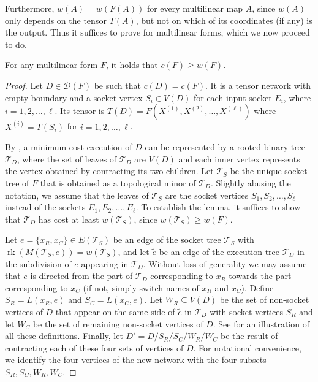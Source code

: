 \documentclass{toc}
\newcommand{\rk}{\ensuremath{\operatorname{rk}}}
\newcommand{\ts}{\ensuremath{\mathcal{T}_S}}
\newcommand{\td}{\ensuremath{\mathcal{T}_D}}
\begin{document}
Furthermore, $w(A) = w(F(A))$ for every multilinear map $A$, since
$w(A)$ only depends on the tensor $T(A)$, but not on which of its coordinates (if any) is the output.
Thus it suffices to prove  for
multilinear forms, which we now proceed to do.

\begin{lemma}
  For any multilinear form $F$, it holds that $c(F) \ge w(F)$.
\end{lemma}

\begin{proof}
  Let $D\in\mathscr{D}(F)$ be such that $c(D)=c(F)$. It is a tensor
  network with empty boundary and a socket vertex $S_i \in V(D)$ for
  each input socket $E_i$, where $i=1,2,\ldots,\ell$. Its tensor is
  $T(D) = F(X^{(1)}, X^{(2)},\ldots, X^{(\ell)})$ where $X^{(i)} =
  T(S_i)$ for $i=1,2,\ldots,\ell$.

  By , a minimum-cost execution of $D$
  can be represented by a rooted binary tree $\td$,
  where the set of leaves of $\td$ are $V(D)$ and each inner
  vertex represents the vertex obtained by contracting  its two children. Let $\ts$ be the unique socket-tree of $F$ that is obtained as a topological
  minor of $\td$. Slightly abusing the notation, we assume that the leaves of $\ts$ are the socket vertices  $S_1,S_2,\ldots,S_\ell$ instead of the sockets $E_1,E_2,\ldots,E_\ell$.
  To establish the lemma, it suffices to show that
  $\td$ has cost at least $w(\ts)$, since $w(\ts) \geq w(F)$.

  Let $e = \{x_R, x_C\} \in E(\ts)$ be an edge of the socket tree
  $\ts$ with $\rk(M(\ts, e)) = w(\ts)$, and let $\widetilde{e}$ be an edge of
  the execution tree $\td$ in the subdivision of $e$ appearing in
  $\td$. Without loss of generality we may assume that $\widetilde{e}$ is directed from the part of $\td$ corresponding to $x_R$ towards the part corresponding to $x_C$ (if not, simply switch names of $x_R$ and $x_C$).  Define  $S_R = L(x_R, e)$ and
  $S_C = L(x_C, e)$.  Let $W_R \subseteq V(D)$ be the set of
  non-socket vertices of $D$ that appear on the same side of $\widetilde{e}$ in $\td$ with socket vertices $S_R$ and let
  $W_C$ be the set of remaining non-socket vertices of $D$.  See  for an illustration of all these definitions.
  Finally, let $D' = D / S_R / S_C / W_R / W_C$ be the
  result of contracting each of these four sets of vertices of
  $D$.
  For notational convenience, we identify the four vertices of
  the new network with the four subsets $S_R, S_C, W_R, W_C$.


\end{proof}
\end{document}
